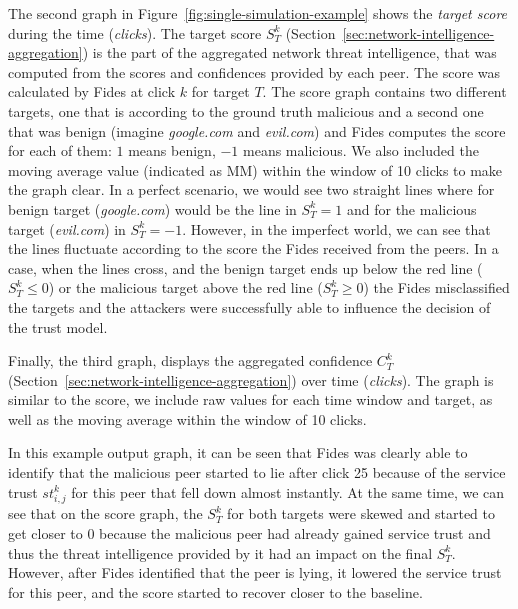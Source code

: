 The second graph in Figure~\ref{fig:single-simulation-example} shows the \textit{target score} during the time (\textit{clicks}).
The target score $S^{k}_{T}$ (Section~\ref{sec:network-intelligence-aggregation}) is the part of the aggregated network threat intelligence, that was computed from the scores and confidences provided by each peer. The score was calculated by Fides at click $k$ for target $T$.
The score graph contains two different targets, one that is according to the ground truth malicious and a second one that was benign (imagine \textit{google.com} and \textit{evil.com}) and Fides computes the score for each of them: $1$ means benign, $-1$ means malicious.
We also included the moving average value (indicated as MM) within the window of 10 clicks to make the graph clear.
In a perfect scenario, we would see two straight lines where for benign target (\textit{google.com}) would be the line in $S^{k}_{T} = 1$ and for the malicious target (\textit{evil.com}) in $S^{k}_{T} = -1$.
However, in the imperfect world, we can see that the lines fluctuate according to the score the Fides received from the peers.
In a case, when the lines cross, and the benign target ends up below the red line ($S^{k}_{T} \leq 0$) or the malicious target above the red line ($S^{k}_{T} \geq 0$) the Fides misclassified the targets and the attackers were successfully able to influence the decision of the trust model.

Finally, the third graph, displays the aggregated confidence $C^{k}_{T}$ (Section~\ref{sec:network-intelligence-aggregation}) over time (\textit{clicks}).
The graph is similar to the score, we include raw values for each time window and target, as well as the moving average within the window of 10 clicks.

In this example output graph, it can be seen that Fides was clearly able to identify that the malicious peer started to lie after click 25 because of the service trust $st^{k}_{i,j}$ for this peer that fell down almost instantly.
At the same time, we can see that on the score graph, the $S^{k}_{T}$ for both targets were skewed and started to get closer to $0$ because the malicious peer had already gained service trust and thus the threat intelligence provided by it had an impact on the final $S^{k}_{T}$.
However, after Fides identified that the peer is lying, it lowered the service trust for this peer, and the score started to recover closer to the baseline.